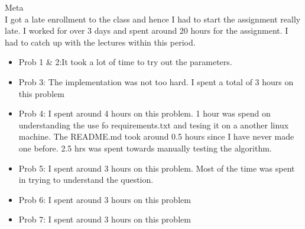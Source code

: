 \documentclass[12pt]{article}
\newenvironment{problem}[2][\large Problem]{\begin{trivlist}
\item[\hskip \labelsep {\bfseries #1}\hskip \labelsep {\bfseries #2.}]}{\end{trivlist}}
\begin{document}
\begin{problem} {8} Meta\\
I got a late enrollment to the class and hence I had to start the assignment really late. I worked for over 3 days and spent around 20 hours for the assignment. I had to catch up with the lectures within this period. 

\begin{itemize}
	\item Prob 1 \& 2:It took a lot of time to try out the parameters.
	\item Prob 3: The implementation was not too hard. I spent a total of 3 hours on this problem
	\item Prob 4: I spent around 4 hours on this problem. 1 hour was spend on understanding the use fo requirements.txt and tesing it on a another linux machine. The README.md took around 0.5 hours since I have never made one before. 2.5 hrs was spent towards manually testing the algorithm.
	\item Prob 5: I spent around 3 hours on this problem. Most of the time was spent in trying to understand the question. 
	\item Prob 6: I spent around 3 hours on this problem 
	\item Prob 7: I spent around 3 hours on this problem
	
\end{itemize}


\end{problem}
\end{document}
